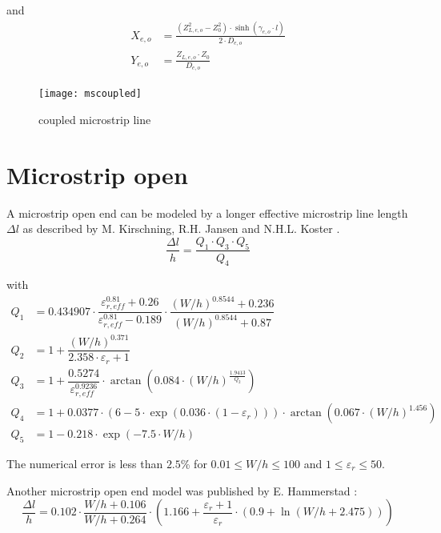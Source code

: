 \documentclass[10pt]{report}
\begin{document}
and
\begin{align}
X_{e,o} &= \frac{\left(Z_{L,e,o}^2 - Z_0^2\right)\cdot \sinh\left(\gamma_{e,o}\cdot l\right)}{2\cdot D_{e,o}}\\
Y_{e,o} &= \frac{Z_{L,e,o}\cdot Z_0}{D_{e,o}}
\end{align}

\begin{figure}[ht]
\begin{center}
\texttt{[image: mscoupled]}
\end{center}
\caption{coupled microstrip line}
\label{fig:mscoupled}
\end{figure}
\FloatBarrier

\section{Microstrip open}

A microstrip open end can be modeled by a longer effective microstrip
line length $\Delta l$ as described by M. Kirschning, R.H. Jansen and
N.H.L. Koster \cite{Kirschning7}.
\begin{equation}
\frac{\Delta l}{h} = \frac{Q_1\cdot Q_3\cdot Q_5}{Q_4}
\end{equation}

with
\begin{align}
Q_1 &= 0.434907\cdot \dfrac{\varepsilon_{r,eff}^{0.81}+0.26}{\varepsilon_{r,eff}^{0.81}-0.189}\cdot
      \dfrac{\left( W/h \right)^{0.8544} + 0.236}{\left( W/h \right)^{0.8544} + 0.87}\\
Q_2 &= 1 + \dfrac{\left( W/h \right) ^{0.371}}{2.358\cdot \varepsilon_r + 1}\\
Q_3 &= 1 + \dfrac{0.5274}{\varepsilon_{r,eff}^{0.9236}} \cdot
      \arctan\left( 0.084\cdot\left( W/h \right) ^{\tfrac{1.9413}{Q_2}} \right)\\
Q_4 &= 1 + 0.0377\cdot \left( 6-5\cdot\exp{\left(0.036\cdot\left(1-\varepsilon_r\right)\right)} \right)\cdot
      \arctan\left( 0.067\cdot\left(W/h\right)^{1.456} \right)\\
Q_5 &= 1 - 0.218\cdot \exp{\left( -7.5\cdot W/h \right)}
\end{align}

The numerical error is less than $2.5$\% for $0.01\le W/h \le 100$ and
$1\le\varepsilon_r\le 50$.

\addvspace{12pt}

Another microstrip open end model was published by E. Hammerstad
\cite{Hammerstad2}:
\begin{equation}
\dfrac{\Delta l}{h} = 0.102\cdot \dfrac{W/h+0.106}{W/h+0.264} \cdot
    \left( 1.166 + \dfrac{\varepsilon_r+1}{\varepsilon_r}\cdot \left(0.9+\ln{\left(W/h+2.475\right)} \right) \right)
\end{equation}
\end{document}
